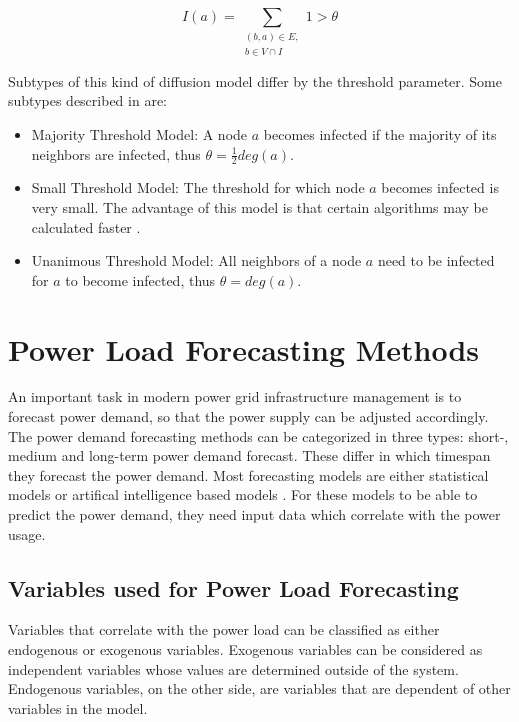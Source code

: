 \begin{equation}
    I(a) = \sum\limits_{\substack{(b,a)\in E, \\ b \in V \cap I}}
    1 > \theta    
    \label{eq:threshold}
\end{equation}

Subtypes of this kind of diffusion model differ by the threshold parameter.
Some subtypes described in \cite{diffusionbasics} are:

\begin{itemize}
    \item Majority Threshold Model: A node $a$ becomes
    infected if the majority of its neighbors are infected, thus 
    $\theta = \frac{1}{2}deg(a)$.
    \item Small Threshold Model: The threshold for which
    node $a$ becomes infected is very small. The advantage of this model is that 
    certain algorithms may be calculated faster \cite{diffusionbasics}.
    \item Unanimous Threshold Model: All neighbors 
    of a node $a$ need to be infected for $a$ to become infected, thus
    $\theta = deg(a)$.
\end{itemize}


\section{Power Load Forecasting Methods}
\label{powerloadsection}

An important task in modern power grid infrastructure management 
is to forecast power demand, so that the power supply can be adjusted accordingly.
The power demand forecasting methods can be categorized in three types:
short-, medium and long-term power demand forecast. These differ in which
timespan they forecast the power demand. Most forecasting models are 
either statistical models or artifical intelligence based models 
\cite{raza2015review}. For these models to be able to predict the power 
demand, they need input data which correlate with the power 
usage. 

\subsection{Variables used for Power Load Forecasting}

Variables that correlate with the power load 
can be classified as either endogenous or exogenous variables.
Exogenous variables can be considered as independent variables 
whose values are determined outside of the system. 
Endogenous variables, on the other side, 
are variables that are dependent of other variables in the 
model.

